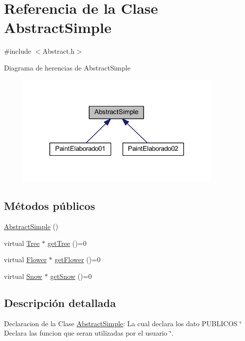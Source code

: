 \hypertarget{class_abstract_simple}{}\section{Referencia de la Clase Abstract\+Simple}
\label{class_abstract_simple}


{\ttfamily \#include $<$Abstract.\+h$>$}



Diagrama de herencias de Abstract\+Simple
\nopagebreak
\begin{figure}[H]
\begin{center}
\leavevmode
\includegraphics[width=284pt]{class_abstract_simple__inherit__graph}
\end{center}
\end{figure}
\subsection*{Métodos públicos}
\begin{DoxyCompactItemize}
\item 
\mbox{\hyperlink{class_abstract_simple_a57d8b82248ae0f609b02b84978f54500}{Abstract\+Simple}} ()
\item 
virtual \mbox{\hyperlink{class_tree}{Tree}} $\ast$ \mbox{\hyperlink{class_abstract_simple_ad90f5d7d3415a29af8bbf10ad8d89772}{get\+Tree}} ()=0
\item 
virtual \mbox{\hyperlink{class_flower}{Flower}} $\ast$ \mbox{\hyperlink{class_abstract_simple_a32da8b68a506bf223035acc62451724f}{get\+Flower}} ()=0
\item 
virtual \mbox{\hyperlink{class_snow}{Snow}} $\ast$ \mbox{\hyperlink{class_abstract_simple_aad971de50be686f491109651a387ce5e}{get\+Snow}} ()=0
\end{DoxyCompactItemize}


\subsection{Descripción detallada}
Declaracion de la Clase \mbox{\hyperlink{class_abstract_simple}{Abstract\+Simple}}\+: La cual declara los dato P\+U\+B\+L\+I\+C\+OS \char`\"{} Declara las funcion que seran utilizadas por el usuario \char`\"{}. 

